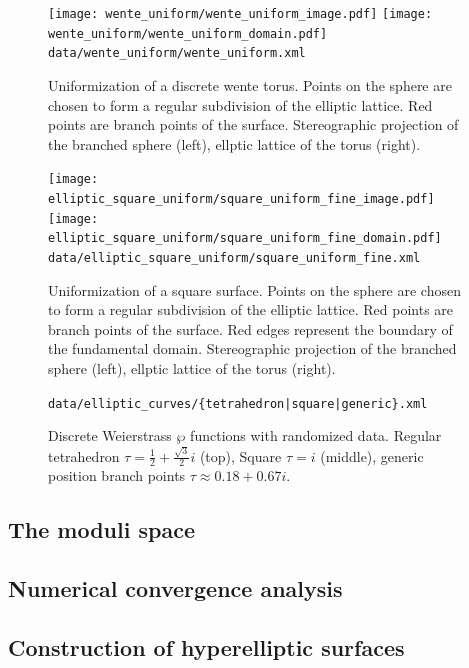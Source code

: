 \documentclass[Thesis.tex]{subfiles}
\begin{document}
\begin{figure}
\centering
\texttt{[image: wente\_uniform/wente\_uniform\_image.pdf]}
\texttt{[image: wente\_uniform/wente\_uniform\_domain.pdf]}
{\scriptsize\tt data/wente\_uniform/wente\_uniform.xml}
\caption{Uniformization of a discrete wente torus. Points on the sphere are
chosen to form a regular subdivision of the elliptic lattice. Red points are
branch points of the surface.  Stereographic projection of the branched sphere
(left), ellptic lattice of the torus (right).} \label{fig:wente_elliptic}
\end{figure}

\begin{figure}
\centering
\texttt{[image: elliptic\_square\_uniform/square\_uniform\_fine\_image.pdf]}
\texttt{[image: elliptic\_square\_uniform/square\_uniform\_fine\_domain.pdf]}
{\scriptsize\tt data/elliptic\_square\_uniform/square\_uniform\_fine.xml}
\caption{Uniformization of a square surface. Points on the sphere are chosen
to form a regular subdivision of the elliptic lattice. Red points are branch
points of the surface. Red edges represent the boundary of the fundamental
domain. Stereographic projection of the branched sphere (left), ellptic
lattice of the torus (right).} 
\label{fig:square_elliptic} 
\end{figure}	


\begin{figure}[p] 
\centering
{}
{\scriptsize\tt data/elliptic\_curves/\{tetrahedron|square|generic\}.xml}
\caption{Discrete Weierstrass $\wp$ functions with randomized data. Regular
tetrahedron $\tau=\frac{1}{2}+\frac{\sqrt 3}{2}i$ (top), Square $\tau=i$
(middle), generic position branch points $\tau \approx 0.18+0.67i$.}
\end{figure}

\subsection{The moduli space}
\subsection{Numerical convergence analysis}

\subsection{Construction of hyperelliptic surfaces}
\label{sec:examples_hyperelliptic}
\end{document}
